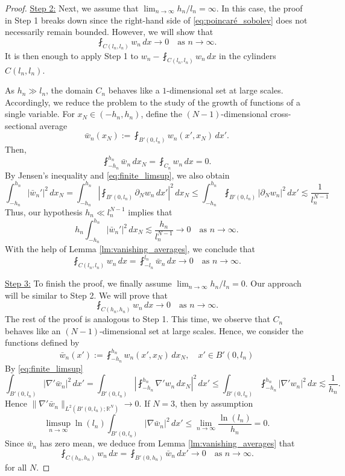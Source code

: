 \documentclass{article}
\numberwithin{equation}{section}
\theoremstyle{definition}
\theoremstyle{remark}
\begin{document}
\begin{proof}
    \underline{Step 2:} Next, we assume that $\lim_{n \to \infty} h_n/l_n = \infty$. In this case, the proof in Step 1 breaks down since the right-hand side of \eqref{eq:poincaré_sobolev} does not necessarily remain bounded. However, we will show that
    \[
    \fint_{C(l_n, l_n)} w_n \, dx \to 0 \quad \text{as } n \to \infty.
    \]
    It is then enough to apply Step 1 to $w_n - \fint_{C(l_n, l_n)} w_n \, dx$ in the cylinders $C(l_n, l_n)$.
    
    As $h_n \gg l_n$, the domain $C_n$ behaves like a $1$-dimensional set at large scales. Accordingly, we reduce the problem to the study of the growth of functions of a single variable. For $x_N \in (-h_n, h_n)$, define the $(N - 1)$-dimensional cross-sectional average
    \[
    \bar{w}_n(x_N) := \fint_{B'(0, l_n)} w_n(x', x_N) \, dx'.
    \]
    Then,
    \[
    \fint_{-h_n}^{h_n} \bar{w}_n \, dx_N = \fint_{C_n} w_n \, dx = 0.
    \]
    By Jensen's inequality and \eqref{eq:finite_limsup}, we also obtain
    \[
    \int_{-h_n}^{h_n} |\bar{w}_n'|^2 \, dx_N = \int_{-h_n}^{h_n} \left| \fint_{B'(0, l_n)} \partial_N w_n \, dx' \right|^2 \, dx_N \le \int_{-h_n}^{h_n} \fint_{B'(0, l_n)} |\partial_N w_n|^2 \, dx' \lesssim \frac{1}{l_n^{N - 1}}
    \]
    Thus, our hypothesis $h_n \ll l_n^{N - 1}$ implies that
    \[
    h_n \int_{-h_n}^{h_n} |\bar{w}_n'|^2 \, dx_N \lesssim \frac{h_n}{l_n^{N - 1}} \to 0 \quad \text{as } n \to \infty.
    \]
    With the help of Lemma \ref{lm:vanishing_averages}, we conclude that
    \[
    \fint_{C(l_n, l_n)} w_n \, dx = \fint_{-l_n}^{l_n} \bar{w}_n \, dx \to 0 \quad \text{as } n \to \infty.
    \]

    \underline{Step 3:} To finish the proof, we finally assume $\lim_{n \to \infty} h_n/l_n = 0$. Our approach will be similar to Step 2. We will prove that
    \[
    \fint_{C(h_n, h_n)} w_n \, dx \to 0 \quad \text{as } n \to \infty.
    \]
    The rest of the proof is analogous to Step 1. This time, we observe that $C_n$ behaves like an $(N - 1)$-dimensional set at large scales. Hence, we consider the functions defined by
    \[
    \bar{w}_n(x') := \fint_{-h_n}^{h_n} w_n(x', x_N) \, dx_N, \quad x' \in B'(0, l_n)
    \]
    By \eqref{eq:finite_limsup}
    \[
    \int_{B'(0, l_n)} |\nabla' \bar{w}_n|^2 \, dx' = \int_{B'(0, l_n)} \left|\fint_{-h_n}^{h_n} \nabla' w_n \, dx_N \right|^2 \, dx' \le \int_{B'(0, l_n)} \fint_{-h_n}^{h_n} |\nabla' w_n|^2 \, dx \lesssim \frac{1}{h_n}.
    \]
    Hence $\|\nabla' \bar{w}_n\|_{L^2(B'(0, l_n); \mathbb{R}^N)} \to 0$. If $N = 3$, then by assumption
    \[
    \limsup_{n \to \infty} \ln(l_n) \int_{B'(0, l_n)} |\nabla \bar{w}_n|^2 \, dx' \le \lim_{n \to \infty} \frac{\ln(l_n)}{h_n} = 0.
    \]
    Since $\bar{w}_n$ has zero mean, we deduce from Lemma \ref{lm:vanishing_averages} that
    \[
    \fint_{C(h_n, h_n)} w_n \, dx = \fint_{B'(0, h_n)} \bar{w}_n \, dx' \to 0 \quad \text{as } n \to \infty.
    \]
    for all $N$.
\end{proof}
\end{document}
